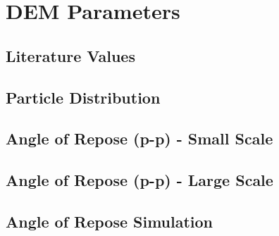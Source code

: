 
\chapter{DEM Parameters}
\label{cap:demparameters}

\lipsum[1]

\section{Literature Values}
\label{sec:literaturevalues}

\lipsum[1]

\section{Particle Distribution}
\label{sec:particledistribution}

\lipsum[1]

% 



\lipsum[1]


\section{Angle of Repose (p-p) - Small Scale}
\label{sec:aor}


\lipsum[1]

\section{Angle of Repose (p-p) - Large Scale}
\label{sec:aorlargescale}


\lipsum[1]

\section{Angle of Repose Simulation}
\label{sec:aorsimulation}


